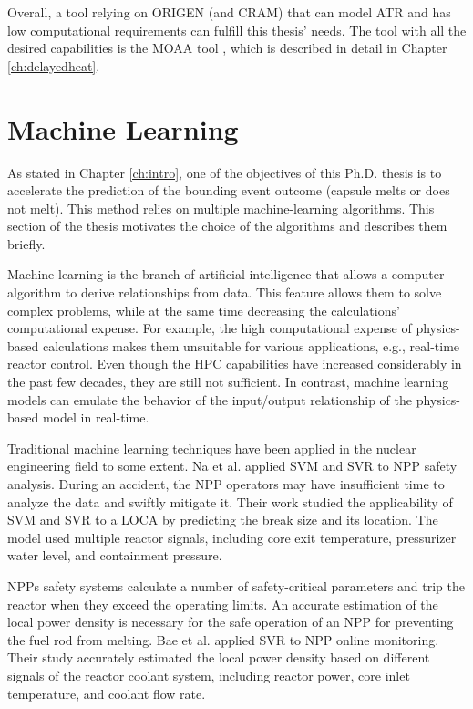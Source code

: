 Overall, a tool relying on ORIGEN (and CRAM) that can model ATR and has low computational requirements can fulfill this thesis' needs.
The tool with all the desired capabilities is the \gls*{MOAA} tool \cite{fairhurst_development_2022}, which is described in detail in Chapter \ref{ch:delayedheat}.


\section{Machine Learning}

As stated in Chapter \ref{ch:intro}, one of the objectives of this Ph.D. thesis is to accelerate the prediction of the bounding event outcome (capsule melts or does not melt).
This method relies on multiple machine-learning algorithms.
This section of the thesis motivates the choice of the algorithms and describes them briefly.

Machine learning is the branch of artificial intelligence that allows a computer algorithm to derive relationships from data.
This feature allows them to solve complex problems, while at the same time decreasing the calculations' computational expense.
For example, the high computational expense of physics-based calculations makes them unsuitable for various applications, e.g., real-time reactor control.
Even though the \gls*{HPC} capabilities have increased considerably in the past few decades, they are still not sufficient.
In contrast, machine learning models can emulate the behavior of the input/output relationship of the physics-based model in real-time.

Traditional machine learning techniques have been applied in the nuclear engineering field to some extent.
Na et al. \cite{na_detection_2008} applied \gls*{SVM} and \gls*{SVR} to \gls*{NPP} safety analysis.
During an accident, the NPP operators may have insufficient time to analyze the data and swiftly mitigate it.
Their work studied the applicability of \gls*{SVM} and \gls*{SVR} to a \gls*{LOCA} by predicting the break size and its location.
The model used multiple reactor signals, including core exit temperature, pressurizer water level, and containment pressure.

NPPs safety systems calculate a number of safety-critical parameters and trip the reactor when they exceed the operating limits.
An accurate estimation of the local power density is necessary for the safe operation of an NPP for preventing the fuel rod from melting.
Bae et al. \cite{bae_estimation_2009} applied \gls*{SVR} to \gls*{NPP} online monitoring.
Their study accurately estimated the local power density based on different signals of the reactor coolant system, including reactor power, core inlet temperature, and coolant flow rate.

